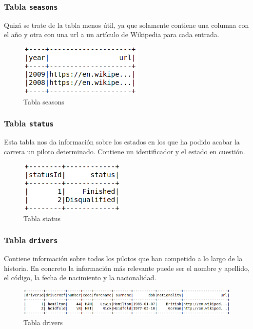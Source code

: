 \documentclass[12pt,twoside,titlepage]{report}
\begin{document}
\subsubsection{Tabla \texttt{seasons}}

Quizá se trate de la tabla menos útil, ya que solamente contiene una columna con el año y otra con una url a un artículo de Wikipedia para cada entrada. 

\begin{figure}[H]
  \includegraphics[scale=0.5]{season_table.png}
  \centering
  \caption{Tabla seasons}
  \label{fig:seasonstable}
  \centering
\end{figure}


\subsubsection{Tabla \texttt{status}}

Esta tabla nos da información sobre los estados en los que ha podido acabar la carrera un piloto determinado. Contiene un identificador y el estado en cuestión. 

\begin{figure}[H]
  \includegraphics[scale=0.5]{status_table.png}
  \centering
  \caption{Tabla status}
  \label{fig:statustable}
  \centering
\end{figure}

\subsubsection{Tabla \texttt{drivers}}

Contiene información sobre todos los pilotos que han competido a lo largo de la historia. En concreto la información más relevante puede ser el nombre y apellido, el código, la fecha de nacimiento y la nacionalidad. 

\begin{figure}[H]
  \includegraphics[scale=0.5]{driver_table.png}
  \centering
  \caption{Tabla drivers}
  \label{fig:driverstable}
  \centering
\end{figure}
\end{document}
